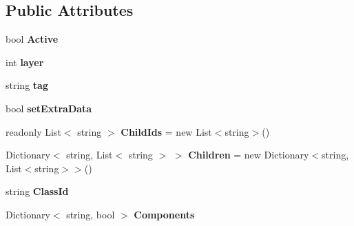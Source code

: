\subsection*{Public Attributes}
\begin{DoxyCompactItemize}
\item 
\mbox{\label{class_level_serializer_1_1_stored_item_a4b06764c8b12b1fa93f3998fff3cec43}} 
bool {\bfseries Active}
\item 
\mbox{\label{class_level_serializer_1_1_stored_item_ab417bb1160e27533ab32d21ae00b8e44}} 
int {\bfseries layer}
\item 
\mbox{\label{class_level_serializer_1_1_stored_item_ab053de4512b0a11644a519d03df14072}} 
string {\bfseries tag}
\item 
\mbox{\label{class_level_serializer_1_1_stored_item_a4b8e0f3cc2ddd5971718989876df2d9b}} 
bool {\bfseries set\+Extra\+Data}
\item 
\mbox{\label{class_level_serializer_1_1_stored_item_a1efb451e94bbf1f94e342e5a27482db6}} 
readonly List$<$ string $>$ {\bfseries Child\+Ids} = new List$<$string$>$()
\item 
\mbox{\label{class_level_serializer_1_1_stored_item_ad8df20b6800e56c64374ca090510f652}} 
Dictionary$<$ string, List$<$ string $>$ $>$ {\bfseries Children} = new Dictionary$<$string, List$<$string$>$$>$()
\item 
\mbox{\label{class_level_serializer_1_1_stored_item_a4361f3d9b6725d74d95152e2b03c5c9c}} 
string {\bfseries Class\+Id}
\item 
\mbox{\label{class_level_serializer_1_1_stored_item_a6560ec08e2fe87c0ef5ce40ae8982cb4}} 
Dictionary$<$ string, bool $>$ {\bfseries Components}
\item 
\mbox{\label{class_level_serializer_1_1_stored_item_a4333483aa71571e6dd42a4e5b9d64f55}} 
$$
\end{DoxyCompactItemize}
